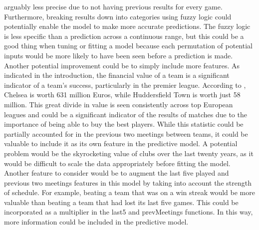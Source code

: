 \documentclass[sigconf]{acmart}
\begin{document}
arguably less precise due to not having previous results for every game. Furthermore, breaking results down into categories using fuzzy logic could potentially enable the model to make more accurate predictions. The fuzzy logic is less specific than a prediction across a continuous range, but this could be a good thing when tuning or fitting a model because each permutation of potential inputs would be more likely to have been seen before a prediction is made. 
Another potential improvement could be to simply include more features. As indicated in the introduction, the financial value of a team is a significant indicator of a team's success, particularly in the premier league. According to \cite{TransferMarkt}, Chelsea is worth 631 million Euros, while Huddersfield Town is worth just 58 million. This great divide in value is seen consistently across top European leagues and could be a significant indicator of the results of matches due to the importance of being able to buy the best players. While this statistic could be partially accounted for in the previous two meetings between teams, it could be valuable to include it as its own feature in the predictive model. A potential problem would be the skyrocketing value of clubs over the last twenty years, as it would be difficult to scale the data appropriately before fitting the model.
Another feature to consider would be to augment the last five played and previous two meetings features in this model by taking into account the strength of schedule. For example, beating a team that was on a win streak would be more valuable than beating a team that had lost its last five games. This could be incorporated as a multiplier in the last5 and prevMeetings functions. In this way, more information could be included in the predictive model.
\end{document}
